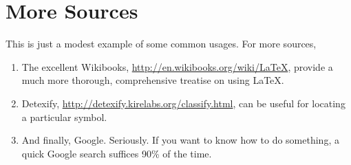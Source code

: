 \documentclass[11pt]{article}
\theoremstyle{plain} %
\theoremstyle{definition}
\theoremstyle{remark}
\begin{document}
\section{More Sources}
This is just a modest example of some common usages. For more sources,
\begin{enumerate}
	\item The excellent Wikibooks,
		\url{http://en.wikibooks.org/wiki/LaTeX},
		provide a much more thorough, comprehensive treatise on using \LaTeX.
	\item Detexify, \url{http://detexify.kirelabs.org/classify.html},
		can be useful for locating a particular symbol.
	\item And finally, Google. Seriously.
		If you want to know how to do something,
		a quick Google search suffices 90\% of the time.
\end{enumerate}
\end{document}
